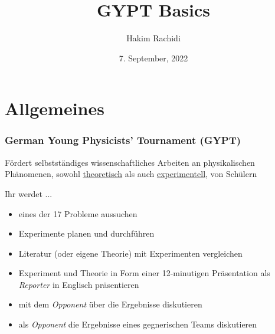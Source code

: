 \documentclass[9pt]{beamer}
\author{Hakim Rachidi}
\title{GYPT Basics}
\date{7. September, 2022}
\begin{document}
\begin{frame}
\titlepage
\end{frame}

\section{Allgemeines}

\begin{frame}
\frametitle{German Young Physicists' Tournament (GYPT)}


\begin{center}
{\large Fördert \color{orange} selbstständiges \color{blue}wissenschaftliches \color{black} Arbeiten an physikalischen Phänomenen, sowohl \underline{theoretisch} als auch \underline{experimentell}, von Schülern}
\end{center}
\pause
\vfill

Ihr werdet ...
\begin{itemize}
\item eines der 17 Probleme aussuchen
\item Experimente planen und durchführen
\item Literatur (oder eigene Theorie) mit Experimenten vergleichen
\item Experiment und Theorie in Form einer 12-minutigen Präsentation als \emph{Reporter} in Englisch präsentieren
\item mit dem \emph{Opponent} über die Ergebnisse diskutieren
\item als \emph{Opponent} die Ergebnisse eines gegnerischen Teams diskutieren
\end{itemize}
\end{frame}
\end{document}
